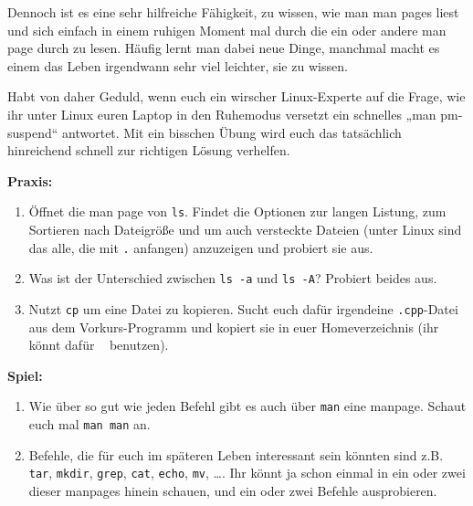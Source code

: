 Dennoch ist es eine sehr hilfreiche Fähigkeit, zu wissen, wie man man pages
liest und sich einfach in einem ruhigen Moment mal durch die ein oder andere
man page durch zu lesen. Häufig lernt man dabei neue Dinge, manchmal macht es
einem das Leben irgendwann sehr viel leichter, sie zu wissen.

Habt von daher Geduld, wenn euch ein wirscher Linux-Experte auf die Frage, wie
ihr unter Linux euren Laptop in den Ruhemodus versetzt ein schnelles „man
pm-suspend“ antwortet. Mit ein bisschen Übung wird euch das tatsächlich
hinreichend schnell zur richtigen Lösung verhelfen.

\textbf{Praxis:}
\begin{enumerate}[resume]
    \item Öffnet die man page von \texttt{ls}. Findet die Optionen zur langen
        Listung, zum Sortieren nach Dateigröße und um auch versteckte Dateien
        (unter Linux sind das alle, die mit \texttt{.} anfangen) anzuzeigen und
        probiert sie aus.
    \item Was ist der Unterschied zwischen \texttt{ls -a} und \texttt{ls -A}?
        Probiert beides aus.
    \item Nutzt \texttt{cp} um eine Datei zu kopieren. Sucht euch dafür
        irgendeine \texttt{.cpp}-Datei aus dem Vorkurs-Programm und kopiert sie
        in euer Homeverzeichnis (ihr könnt dafür \texttt{~} benutzen).
\end{enumerate}

\textbf{Spiel:}
\begin{enumerate}
    \item Wie über so gut wie jeden Befehl gibt es auch über \texttt{man} eine
        manpage. Schaut euch mal \texttt{man man} an.
    \item Befehle, die für euch im späteren Leben interessant sein könnten sind
        z.B. \texttt{tar}, \texttt{mkdir}, \texttt{grep}, \texttt{cat},
        \texttt{echo}, \texttt{mv}, \dots. Ihr könnt ja schon einmal in ein
        oder zwei dieser manpages hinein schauen, und ein oder zwei Befehle
        ausprobieren.
\end{enumerate}
